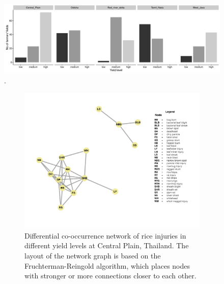 \begin{figure}
    \centering
        \includegraphics[width = 1\textwidth]{figures/yield_level_bar.pdf}
        \caption{.}
        \label{fig:yield_level_bar}
\end{figure}

\begin{figure}
    \centering
    \begin{subfigure}[b]{1\textwidth}
        \includegraphics[width = 1\textwidth]{figures/difyieldCP.pdf}
        \caption{Differential co-occurrence network of rice injuries in different yield levels at Central Plain, Thailand. The layout of the network graph is based on the Fruchterman-Reingold algorithm, which places nodes with stronger or more connections closer to each other.}
        \label{fig:difyieldCP}
    \end{subfigure}
    \begin{subfigure}[b]{1\textwidth}

\end{subfigure}
\end{figure}
